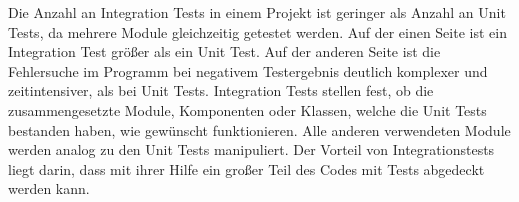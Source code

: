 Die Anzahl an Integration Tests in einem Projekt ist geringer als Anzahl an Unit Tests, da mehrere Module gleichzeitig getestet werden.
Auf der einen Seite ist ein Integration Test größer als ein Unit Test. 
Auf der anderen Seite ist die Fehlersuche im Programm bei negativem Testergebnis deutlich komplexer und zeitintensiver, 
als bei Unit Tests.
Integration Tests stellen fest, ob die zusammengesetzte Module, Komponenten oder Klassen, welche die Unit Tests bestanden haben, wie gewünscht funktionieren.
Alle anderen verwendeten Module werden analog zu den Unit Tests manipuliert.
Der Vorteil von Integrationstests liegt darin, dass mit ihrer Hilfe ein großer Teil des Codes mit Tests abgedeckt werden kann.